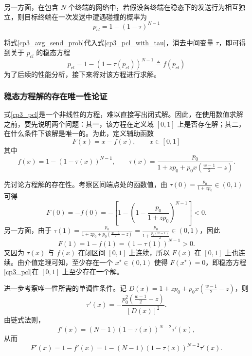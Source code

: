 另一方面，在包含 $N$ 个终端的网络中，若假设各终端在稳态下的发送行为相互独立，则目标终端在一次发送中遭遇碰撞的概率为
\begin{equation}\label{cp3_pcl_with_tau}
    p_{cl} = 1- (1-\tau)^{N-1}
\end{equation}

将式\eqref{cp3_avg_send_prob}代入式\eqref{cp3_pcl_with_tau}，消去中间变量 $\tau$，即可得到关于 $p_{cl}$ 的稳态方程
\begin{equation}\label{cp3_pcl}
    p_{cl} = 1 - (1 - \tau(p_{cl}))^{N-1} \triangleq f(p_{cl})
\end{equation}
为了后续的性能分析，接下来将对该方程进行求解。

\subsubsection{稳态方程解的存在唯一性论证}

式\eqref{cp3_pcl}是一个非线性的方程，难以直接写出闭式解。因此，在使用数值求解之前，要先说明两个问题：其一，该方程在定义域 $[0,1]$ 上是否存在解；其二，在什么条件下该解是唯一的。为此，定义辅助函数
\begin{equation}
    F(x)=x-f(x), \qquad x\in[0,1]
\end{equation}
其中
\begin{equation}
    f(x)=1-\left(1-\tau(x)\right)^{N-1}, \qquad
    \tau(x)=\frac{p_0}{1+zp_0+p_0x\left(\frac{w-1}{2}-z\right)}.
\end{equation}

先讨论方程解的存在性。考察区间端点处的函数值，由 $\tau(0)=\frac{p_0}{1+zp_0}\in(0,1)$ 可得
\begin{equation}
    F(0)=-f(0)=-\left[1-\left(1-\frac{p_0}{1+zp_0}\right)^{N-1}\right]<0.
\end{equation}
另一方面，由于 $\tau(1)=\frac{p_0}{1+zp_0+p_0\left(\frac{w-1}{2}-z\right)}=\frac{p_0}{1+\frac{p_0(w-1)}{2}}\in(0,1)$，因此
\begin{equation}
    F(1)=1-f(1)=\left(1-\tau(1)\right)^{N-1}>0.
\end{equation}
又因为 $\tau(x)$ 与 $f(x)$ 在闭区间 $[0,1]$ 上连续，所以 $F(x)$ 在 $[0,1]$ 上也连续。由介值定理可知，至少存在一个 $x^\star\in(0,1)$ 使得 $F(x^\star)=0$，即稳态方程\eqref{cp3_pcl}在 $[0,1]$ 上至少存在一个解。

进一步考察唯一性所需的单调性条件。记 $D(x)=1+zp_0+p_0x\left(\frac{w-1}{2}-z\right)$，则
\begin{equation}
    \tau'(x)= -\frac{p_0^2\left(\frac{w-1}{2}-z\right)}{[D(x)]^2}.
\end{equation}
由链式法则，
\begin{equation}
    f'(x)=(N-1)\left(1-\tau(x)\right)^{N-2}\tau'(x),
\end{equation}
从而
\begin{equation}
    F'(x)=1-f'(x)
    =1-(N-1)\left(1-\tau(x)\right)^{N-2}\tau'(x).
\end{equation}


